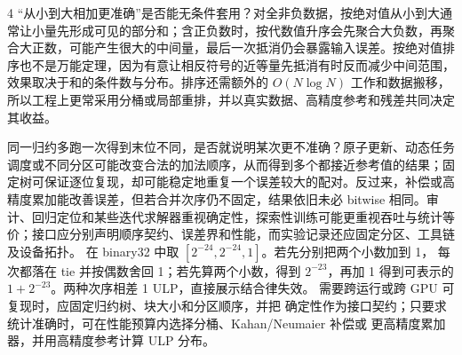 \begin{solutionexercise}{4}
“从小到大相加更准确”是否能无条件套用？对全非负数据，按绝对值从小到大通常让小量先形成可见的部分和；含正负数时，按代数值升序会先聚合大负数，再聚合大正数，可能产生很大的中间量，最后一次抵消仍会暴露输入误差。按绝对值排序也不是万能定理，因为有意让相反符号的近等量先抵消有时反而减少中间范围，效果取决于和的条件数与分布。排序还需额外的 $O(N\log N)$ 工作和数据搬移，所以工程上更常采用分桶或局部重排，并以真实数据、高精度参考和残差共同决定其收益。

同一归约多跑一次得到末位不同，是否就说明某次更不准确？原子更新、动态任务调度或不同分区可能改变合法的加法顺序，从而得到多个都接近参考值的结果；固定树可保证逐位复现，却可能稳定地重复一个误差较大的配对。反过来，补偿或高精度累加能改善误差，但若合并次序仍不固定，结果依旧未必 bitwise 相同。审计、回归定位和某些迭代求解器重视确定性，探索性训练可能更重视吞吐与统计等价；接口应分别声明顺序契约、误差界和性能，而实验记录还应固定分区、工具链及设备拓扑。
\variantheading 在 binary32 中取 $[2^{-24},2^{-24},1]$。若先分别把两个小数加到 1，
每次都落在 tie 并按偶数舍回 1；若先算两个小数，得到 $2^{-23}$，再加 1 得到可表示的
$1+2^{-23}$。两种次序相差 1 ULP，直接展示结合律失效。
\practiceheading 需要跨运行或跨 GPU 可复现时，应固定归约树、块大小和分区顺序，并把
确定性作为接口契约；只要求统计准确时，可在性能预算内选择分桶、Kahan/Neumaier 补偿或
更高精度累加器，并用高精度参考计算 ULP 分布。
\end{solutionexercise}

